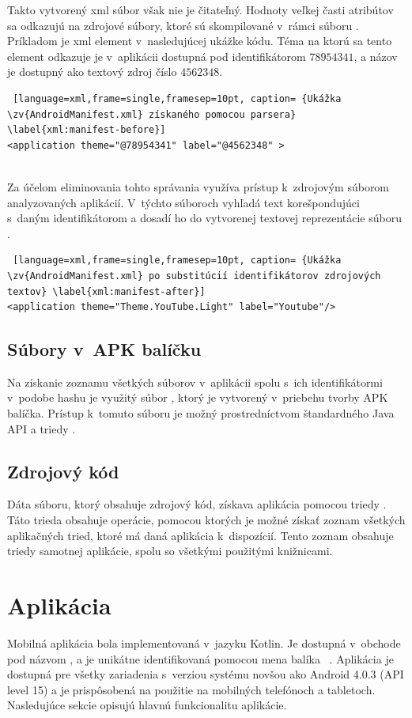 Takto vytvorený xml súbor však nie je čitateľný. Hodnoty veľkej časti atribútov sa odkazujú na zdrojové súbory, ktoré sú skompilované v~rámci súboru . Príkladom je xml element  v~nasledujúcej ukážke kódu. Téma na ktorú sa tento element odkazuje je v~aplikácii dostupná pod identifikátorom $78954341$, a názov je dostupný ako textový zdroj číslo $4562348$.
\mbox{}\\
\begin{lstlisting} [language=xml,frame=single,framesep=10pt, caption= {Ukážka \zv{AndroidManifest.xml} získaného pomocou parsera} \label{xml:manifest-before}]
<application theme="@78954341" label="@4562348" >
\end{lstlisting}
\mbox{}\\
Za účelom eliminovania tohto správania využíva  prístup k~zdrojovým súborom analyzovaných aplikácií. V~týchto súboroch vyhľadá text korešpondujúci s~daným identifikátorom a dosadí ho do vytvorenej textovej reprezentácie súboru .
\mbox{}\\
\begin{lstlisting} [language=xml,frame=single,framesep=10pt, caption= {Ukážka \zv{AndroidManifest.xml} po substitúcií identifikátorov zdrojových textov} \label{xml:manifest-after}]
<application theme="Theme.YouTube.Light" label="Youtube"/>
\end{lstlisting}

\subsection{Súbory v~APK balíčku}
Na získanie zoznamu všetkých súborov v~aplikácii spolu s~ich identifikátormi v~podobe hashu je využitý súbor , ktorý je vytvorený v~priebehu tvorby APK balíčka.  Prístup k~tomuto súboru je možný prostredníctvom štandardného Java API a triedy .

\subsection{Zdrojový kód}
Dáta  súboru, ktorý obsahuje zdrojový kód, získava aplikácia pomocou triedy . Táto trieda obsahuje operácie, pomocou ktorých je možné získať zoznam všetkých aplikačných tried, ktoré má daná aplikácia k~dispozícií. Tento zoznam obsahuje triedy samotnej aplikácie, spolu so všetkými použitými knižnicami. 

\section{Aplikácia}
Mobilná aplikácia bola implementovaná v~jazyku Kotlin. Je dostupná v~obchode  pod názvom , a je unikátne identifikovaná pomocou mena balíka ~\cite{gp}. Aplikácia je dostupná pre všetky zariadenia s~verziou systému novšou ako Android 4.0.3 (API level 15) a  je prispôsobená na použitie na mobilných telefónoch a tabletoch. Nasledujúce sekcie opisujú hlavnú funkcionalitu aplikácie.

